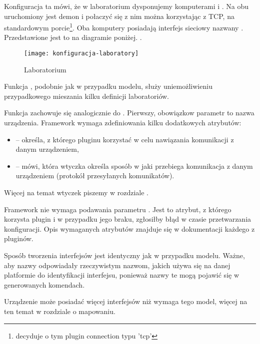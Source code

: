 \documentclass[00-praca-magisterska.tex]{subfiles}
\begin{document}
Konfiguracja ta mówi, że w laboratorium  dysponujemy komputerami
 i . Na obu uruchomiony jest demon  i
połaczyć się z nim można korzystając z TCP, na standardowym
porcie\footnote{decyduje o tym plugin connection typu 'tcp'}. Oba komputery
posiadają interfejs sieciowy nazwany . Przedstawione jest to na
diagramie poniżej. .

\begin{figure}[htb]
\begin{center}
\leavevmode
\texttt{[image: konfiguracja-laboratory]}
\end{center}
\caption{Laboratorium}
\label{fig:konfiguracja-laboratory}
\end{figure}

Funkcja , podobnie jak w przypadku modelu, służy
uniemożliwieniu przypadkowego mieszania kilku definicji laboratoriów.

Funkcja  zachowuje się analogicznie do .
Pierwszy, obowiązkow parametr to nazwa urządzenia. Framework wymaga
zdefiniowania kilku dodatkowych atrybutów:
\begin{itemize}
\item {} -- określa, z którego pluginu korzystać w celu
nawiązania komunikacji z danym urządzeniem,
\item {} -- mówi, która wtyczka określa
sposób w jaki przebiega komunikacja z danym urządzeniem (protokół przesyłanych
komunikatów).
\end{itemize}

Więcej na temat wtyczek piszemy w rozdziale .

Framework nie wymaga podawania parametru . Jest to atrybut, z którego
korzysta plugin  i w przypadku jego braku, zgłosiłby błąd w czasie
przetwarzania konfiguracji. Opis wymaganych atrybutów znajduje się w
dokumentacji każdego z pluginów.

Sposób tworzenia interfejsów jest identyczny jak w przypadku modelu. Ważne,
aby nazwy odpowiadały rzeczywistym nazwom, jakich używa się na danej
platformie do identyfikacji interfejsu, ponieważ nazwy te mogą pojawić się w
generowanych komendach.

Urządzenie może posiadać więcej interfejsów niż wymaga tego model, więcej na
ten temat w rozdziale o mapowaniu. 
\end{document}
